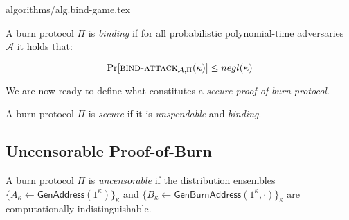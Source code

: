 {algorithms/alg.bind-game.tex}

\begin{definition}[Binding]
  A burn protocol $\Pi$ is \emph{binding} if
  for all probabilistic polynomial-time adversaries $\mathcal{A}$ it holds that:

  \[
    \Pr[\textsc{bind-attack}_{\mathcal{A},\Pi}(\kappa)] \leq negl(\kappa)
  \]
\end{definition}

We are now ready to define what constitutes a \emph{secure proof-of-burn protocol}.

\begin{definition}[Security]
  A burn protocol $\Pi$ is \emph{secure} if it is \emph{unspendable} and \emph{binding}.
\end{definition}

\subsection{Uncensorable Proof-of-Burn}

\begin{definition}[Uncensorability]
  A burn protocol $\Pi$ is \emph{uncensorable} if
  the distribution ensembles $\{A_\kappa \gets \mathsf{GenAddress}(1^\kappa)\}_\kappa$ and
  $\{B_\kappa \gets \mathsf{GenBurnAddress}(1^\kappa, \cdot)\}_\kappa$ are computationally indistinguishable.
\end{definition}
